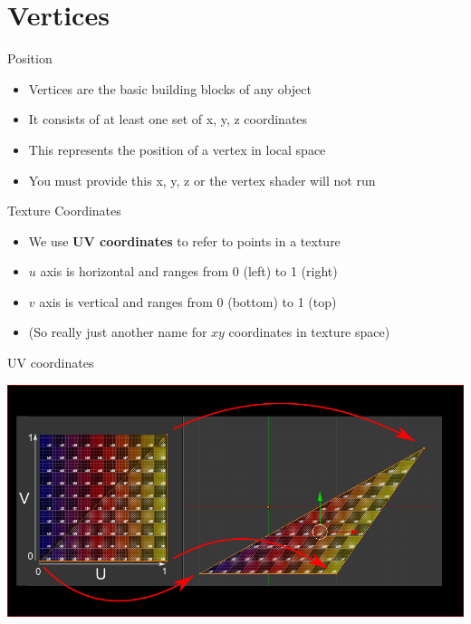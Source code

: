 \part{Vertices}
\frame{\partpage}

\begin{frame}{Position}
	\begin{itemize}
		\item Vertices are the basic building blocks of any object
		\pause\item It consists of at least one set of x, y, z coordinates
		\pause\item This represents the position of a vertex in local space
		\pause\item You must provide this x, y, z or the vertex shader will not run
	\end{itemize}
\end{frame}

\begin{frame}{Texture Coordinates}
	\begin{itemize}
		\item We use \textbf{UV coordinates} to refer to points in a texture
		\pause\item $u$ axis is horizontal and ranges from 0 (left) to 1 (right)
		\pause\item $v$ axis is vertical and ranges from 0 (bottom) to 1 (top)
		\pause\item (So really just another name for $xy$ coordinates in texture space)
	\end{itemize}
\end{frame}

\begin{frame}{UV coordinates}
\begin{center}
	\includegraphics[width=\textwidth]{uv}
\end{center}
\end{frame}

